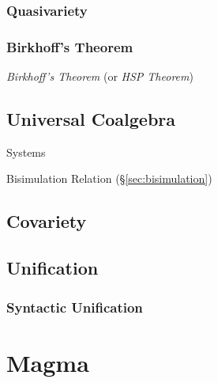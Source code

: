 \subsubsection{Quasivariety}\label{sec:quasivariety}



\subsubsection{Birkhoff's Theorem}\label{sec:birkhoffs_theorem}
\cite{birkhoff35}

\emph{Birkhoff's Theorem} (or \emph{HSP Theorem})



\subsection{Universal Coalgebra}\label{sec:universal_coalgebra}

\cite{rutten00}

Systems

Bisimulation Relation (\S\ref{sec:bisimulation})



\subsection{Covariety}\label{sec:covariety}

\subsection{Unification}\label{sec:unification}

\subsubsection{Syntactic Unification}\label{sec:syntactic_unification}



\section{Magma}\label{sec:magma}

